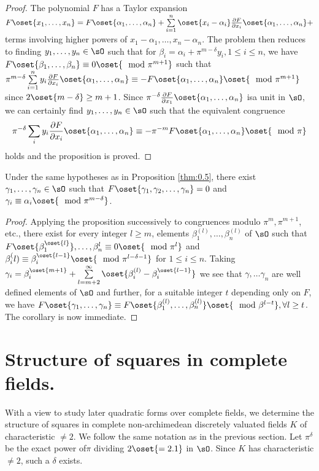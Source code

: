 \begin{proof}
The polynomial $F$ has a Taylor expansion 
$F\oset{x_1,\ldots,x_n}=F\oset{\alpha_1,\ldots,\alpha_n}+\sum\limits_{i=1}^{n}
\oset{x_i-\alpha_i}\frac{\partial F}{\partial 
x_i}\oset{\alpha_1,\ldots,\alpha_n}+$ terms involving higher powers of 
$x_1-\alpha_1,\ldots,x_n-\alpha_n$. The problem then reduces to 
finding $y_1,\ldots,y_n\in\sO$ such that for 
$\beta_i=\alpha_i+\pi^{m-\delta}y_i, 1\leq i\leq n$, we have 
$F\oset{\beta_1,\ldots,\beta_n}\equiv 0\oset{\mod\pi^{m+1}}$ \ie such 
that $\pi^{m-\delta}\sum\limits_{i=1}^{n}y_i\frac{\partial F}{\partial 
x_i}\oset{\alpha_1,\ldots,\alpha_n}\equiv 
-F\oset{\alpha_1,\ldots,\alpha_n} \oset{\mod\pi^{m+1}}$ since 
$2\oset{m-\delta}\geq m+1$. Since $\pi^{-\delta}\frac{\partial 
F}{\partial x_1}\oset{\alpha_1,\ldots,\alpha_n}$ is\pageoriginale a 
unit in $\sO$, we can certainly find $y_1,\ldots,y_n\in\sO$ such that 
the equivalent congruence 
$$
\pi^{-\delta}\sum\limits_i y_i\frac{\partial F}{\partial 
x_i}\oset{\alpha_1,\ldots,\alpha_n}\equiv -\pi^{-m} 
F\oset{\alpha_1,\ldots,\alpha_n}\oset{\mod\pi}
$$
holds and the proposition is proved.
\end{proof}

\begin{coro*}
Under the same hypotheses as in Proposition \ref{thm:0.5}, there 
exist $\gamma_1,\ldots,\gamma_n\in\sO$ such that 
$F\oset{\gamma_1,\gamma_2,\ldots,\gamma_n}=0$ and 
$\gamma_i\equiv\alpha_i\oset{\mod\pi^{m-\delta}}$.
\end{coro*}

\begin{proof}
Applying the proposition successively to congruences modulo 
$\pi^m,\pi^{m+1}$, etc., there exist for every integer $l\geq m$, 
elements $\beta_1^{(l)},\ldots,\beta_n^{(l)}$ of $\sO$ such that 
$F\oset{\beta_1^{\oset{l}}},\ldots,\beta_n^{l}\equiv 
0\oset{\mod\pi^l}$ and $\beta_i^(l)\equiv\beta_i^{\oset{l-1}} 
\oset{\mod\pi^{l-\delta-1}}$ for $1\leq i\leq n$. Taking 
$\gamma_i=\beta_i^{\oset{m+1}}+\sum\limits_{l=m+2}^{\infty} 
\oset{\beta_i^{(l)}-\beta_i^{\oset{l-1}}}$ we see that 
$\gamma,\ldots\gamma_n$ are well defined elements of $\sO$ and 
further, for a suitable integer $t$ depending only on $F$, we have 
$F\oset{\gamma_1,\ldots,\gamma_n}\equiv 
F\oset{\beta_1^{(l)},\ldots,\beta_n^{(l)}} 
\oset{\mod\beta^{l-t}},\forall l\geq t$. The corollary is now 
immediate. 
\end{proof}

\section{Structure of squares in complete fields.}\label{sec0.7}
With a view to study later quadratic forms over complete fields, we 
determine the structure of squares in complete non-archimedean 
discretely valuated fields $K$ of characteristic $\neq 2$. We follow 
the same notation as in the previous section. Let $\pi^\delta$ be the 
exact power of\pageoriginale $\pi$ dividing $2\oset{=2.1}$ in $\sO$. Since $K$ has 
characteristic $\neq 2$, such a $\delta$ exists.

